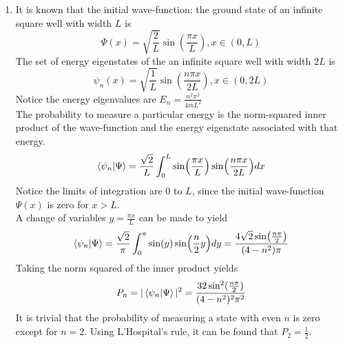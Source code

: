 \begin{sol}
\begin{enumerate}[label=\textbf{(\alph*)}]
\item
It is known that the initial wave-function: the ground state of an infinite square well with width $L$ is
\begin{equation}
    \Psi(x)=\sqrt{\frac{2}{L}}\sin(\frac{\pi x}{L}),x\in(0,L)
\end{equation}
The set of energy eigenstates of the an infinite square well with width $2L$ is
\begin{equation}
    \psi_n(x)=\sqrt{\frac{1}{L}}\sin(\frac{n\pi x}{2L}),x\in(0,2L)
\end{equation}
Notice the energy eigenvalues are $\displaystyle{E_n=\frac{n^2\pi^2}{4mL^2}}$\\
The probability to measure a particular energy is the norm-squared inner product of the wave-function and the energy eigenstate associated with that energy. 
\begin{equation}
    \braket{\psi_n}{\Psi}=\frac{\sqrt 2}{L}\int_0^{L}\sin(\frac{\pi x}{L})\sin(\frac{n\pi x}{2L})dx
\end{equation}
Notice the limits of integration are $0$ to $L$, since the initial wave-function $\Psi(x)$ is zero for $x>L$.\\
A change of variables $y=\frac{\pi x}{L}$ can be made to yield
\begin{equation}
    \braket{\psi_n}{\Psi}=\frac{\sqrt 2}{\pi}\int_0^{\pi}\sin(y)\sin(\frac{n}{2}y)dy=\frac{4\sqrt 2 \sin(\frac{n\pi}{2})}{(4-n^2)\pi}
\end{equation}
Taking the norm squared of the inner product yields
\begin{equation}
    P_n=|\braket{\psi_n}{\Psi}|^2=\frac{32\sin^2(\frac{n\pi}{2})}{(4-n^2)^2\pi^2}
\end{equation}
It is trivial that the probability of measuring a state with even $n$ is zero except for $n=2$. Using L'Hospital's rule, it can be found that $P_2=\frac{1}{2}$.\\


\end{enumerate}
\end{sol}
